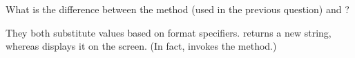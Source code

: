 \Q What is the difference between the  method (used in the previous question) and ?

\begin{answer}
They both substitute values based on format specifiers.
 returns a new string, whereas  displays it on the screen.
(In fact,  invokes the  method.)
\end{answer}

